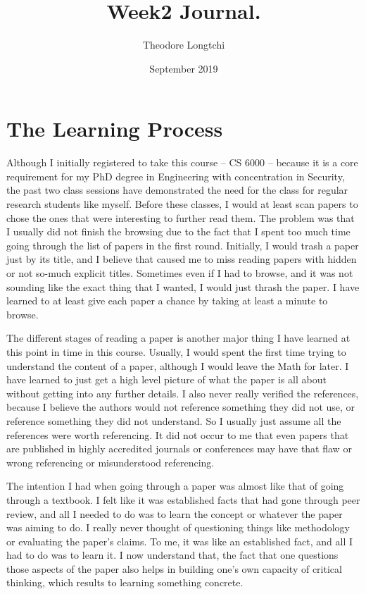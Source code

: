 \documentclass{IEEEtran}
\title{Week2 Journal.}
\author{Theodore Longtchi}
\date{September 2019}
\begin{document}
\maketitle

\section{The Learning Process}
Although I initially registered to take this course – CS 6000 – because it is a core requirement for my PhD degree in Engineering with concentration in Security, the past two class sessions have demonstrated the need for the class for regular research students like myself. Before these classes, I would at least scan papers to chose the ones that were interesting to further read them. The problem was that I usually did not finish the browsing due to the fact that I spent too much time going through the list of papers in the first round. Initially, I would trash a paper just by its title, and I believe that caused me to miss reading papers with hidden or not so-much explicit titles. Sometimes even if I had to browse, and it was not sounding like the exact thing that I wanted, I would just thrash the paper. I have learned to at least give each paper a chance by taking at least a minute to browse.  

The different stages of reading a paper is another major thing I have learned at this point in time in this course. Usually, I would spent the first time trying to understand the content of a paper, although I would leave the Math for later. I have learned to just get a high level picture of what the paper is all about without getting into any further details. I also never really verified the references, because I believe the authors would not reference something they did not use, or reference something they did not understand. So I usually just assume all the references were worth referencing. It did not occur to me that even papers that are published in highly accredited journals or conferences may have that flaw or wrong referencing or misunderstood referencing.    

The intention I had when going through a paper was almost like that of going through a textbook. I felt like it was established facts that had gone through peer review, and all I needed to do was to learn the concept or whatever the paper was aiming to do. I really never thought of questioning things like methodology or evaluating the paper's claims. To me, it was like an established fact, and all I had to do was to learn it. I now understand that, the fact that one questions those aspects of the paper also helps in building one's own capacity of critical thinking, which results to learning something concrete.
\end{document}
